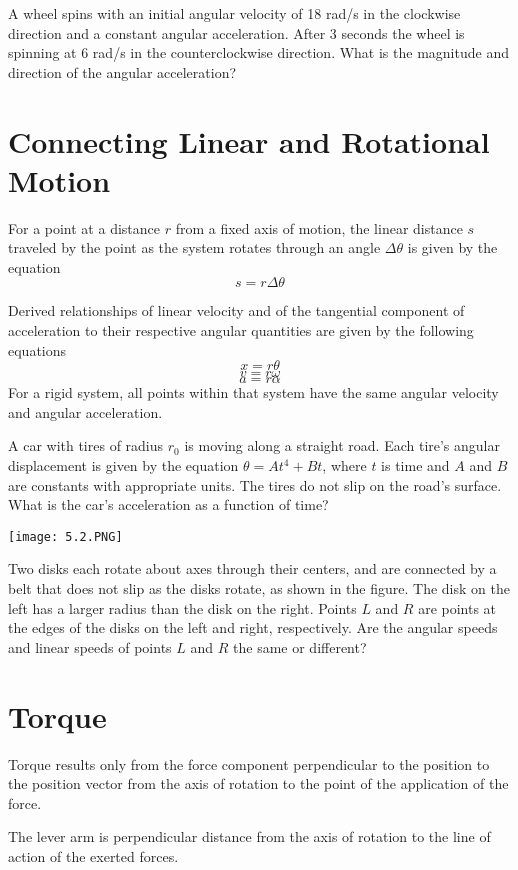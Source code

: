 \documentclass[../mech.tex]{subfiles}
\begin{document}
\ex A wheel spins with an initial angular velocity of 18 rad/s in the clockwise direction and a constant angular acceleration. After 3 seconds the wheel is spinning at 6 rad/s in the counterclockwise direction. What is the magnitude and direction of the angular acceleration?

\section{Connecting Linear and Rotational Motion}
For a point at a distance $r$ from a fixed axis of motion, the linear distance $s$ traveled by the point as the system rotates through an angle $\Delta \theta$ is given by the equation 
\[ s=r\Delta \theta \]

Derived relationships of linear velocity and of the tangential component of acceleration to their respective angular quantities are given by the following equations 
\[ x=r\theta \]
\[ v = r\omega\]
\[ a=r\alpha\]
For a rigid system, all points within that system have the same angular velocity and angular acceleration.

\ex A car with tires of radius $r_0$ is moving along a straight road. Each tire's angular displacement is given by the equation $\theta = At^4+Bt$, where $t$ is time and $A$ and $B$ are constants 
with appropriate units. The tires do not slip on the road's surface. What is the car's acceleration as a function of time?

\ex \begin{center}
    \texttt{[image: 5.2.PNG]}
\end{center}
Two disks each rotate about axes through their centers, and are connected by a belt that does not slip as the disks rotate, as shown in the figure. The disk on the left has a larger radius than the disk on the right.
Points $L$ and $R$ are points at the edges of the disks on the left and right, respectively. Are the angular speeds and linear speeds of points $L$ and $R$ the same or different?

\section{Torque}
Torque results only from the force component perpendicular to the position to the position vector from the axis of rotation to the point of the application of the force.

The lever arm is perpendicular distance from the axis of rotation to the line of action of the exerted forces.
\end{document}
